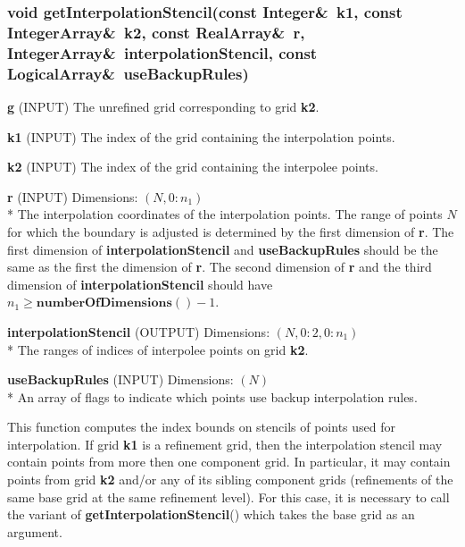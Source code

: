 \documentclass{article}
\begin{document}
  \subsubsection{void getInterpolationStencil(const Integer\&~k1, const IntegerArray\&~k2, const RealArray\&~r, IntegerArray\&~interpolationStencil,  const LogicalArray\&~useBackupRules)}
  \label{CompositeGrid::getInterpolationStencil(k1,k2,r,interpolationStencil,useBackupRules)}
    \begin{description}
      \item{\textbf{g}  (INPUT)} The unrefined grid corresponding to grid \textbf{k2}.
      \item{\textbf{k1} (INPUT)} The index of the grid containing the interpolation points.
      \item{\textbf{k2} (INPUT)} The index of the grid containing the interpolee points.
      \item{\textbf{r}  (INPUT)} Dimensions:  $(N,0\colon n_1)$\\*
                           The interpolation coordinates of the interpolation points.
                           The range of points $N$ for which the boundary is adjusted is determined
                           by the first dimension of \textbf{r}.  The first dimension of
                           \textbf{interpolationStencil} and \textbf{useBackupRules} should be
                           the same as the first the dimension of \textbf{r}.  The second dimension of
                           \textbf{r} and the third dimension of \textbf{interpolationStencil}
                           should have $n_1\ge\textbf{numberOfDimensions}()-1$.
      \item{\textbf{interpolationStencil} (OUTPUT)} Dimensions:  $(N,0\colon2,0\colon n_1)$\\*
                           The ranges of indices of interpolee points on grid \textbf{k2}.
      \item{\textbf{useBackupRules} (INPUT)} Dimensions:  $(N)$\\*
                           An array of flags to indicate which points use backup interpolation rules.
    \end{description}
    This function computes the index bounds on stencils of points used for interpolation.  If grid \textbf{k1} is a refinement grid, then
    the interpolation stencil may contain points from more then one component grid.  In particular, it may contain points from grid \textbf{k2}
    and/or any of its sibling component grids (refinements of the same base grid at the same refinement level).  For this case, it is necessary to call the
    variant of \textbf{getInterpolationStencil}() which takes the base grid as an argument.
\end{document}
